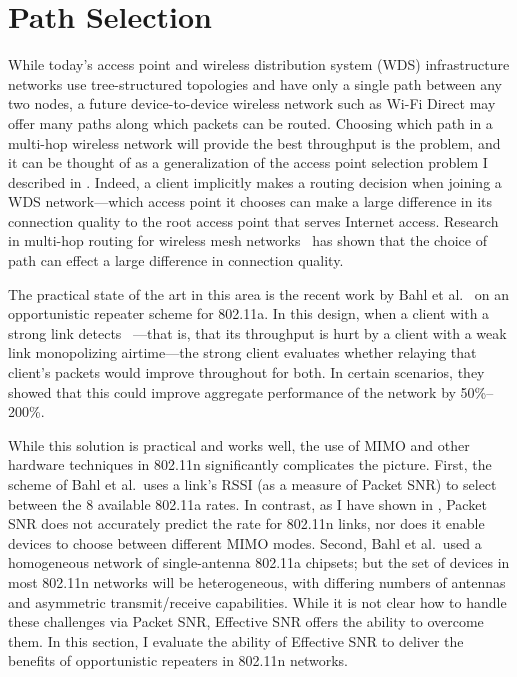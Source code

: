 \section{Path Selection}\label{sec:esnr_pathsel}
While today's access point and wireless distribution system (WDS) infrastructure networks use tree-structured topologies and have only a single path between any two nodes, a future device-to-device wireless network such as Wi-Fi Direct may offer many paths along which packets can be routed. Choosing which path in a multi-hop wireless network will provide the best throughput is the  problem, and it can be thought of as a generalization of the access point selection problem I described in . Indeed, a client implicitly makes a routing decision when joining a WDS network---which access point it chooses can make a large difference in its connection quality to the root access point that serves Internet access. Research in multi-hop routing for wireless mesh networks~\cite{Bahl_repeater,Rodrig_thesis} has shown that the choice of path can effect a large difference in connection quality.

The practical state of the art in this area is the recent work by Bahl et al.~\cite{Bahl_repeater} on an opportunistic repeater scheme for 802.11a. In this design, when a client with a strong link detects ~\cite{Heusse_RateAnomaly}---that is, that its throughput is hurt by a client with a weak link monopolizing airtime---the strong client evaluates whether relaying that client's packets would improve throughout for both. In certain scenarios, they showed that this could improve aggregate performance of the network by 50\%--200\%.

While this solution is practical and works well, the use of MIMO and other hardware techniques in 802.11n significantly complicates the picture. First, the scheme of Bahl et al.\ uses a link's RSSI (as a measure of Packet SNR) to select between the 8 available 802.11a rates. In contrast, as I have shown in , Packet SNR does not accurately predict the rate for 802.11n links, nor does it enable devices to choose between different MIMO modes. Second, Bahl et al.\ used a homogeneous network of single-antenna 802.11a chipsets; but the set of devices in most 802.11n networks will be heterogeneous, with differing numbers of antennas and asymmetric transmit/receive capabilities. While it is not clear how to handle these challenges via Packet SNR, Effective SNR offers the ability to overcome them. In this section, I evaluate the ability of Effective SNR to deliver the benefits of opportunistic repeaters in 802.11n networks.


